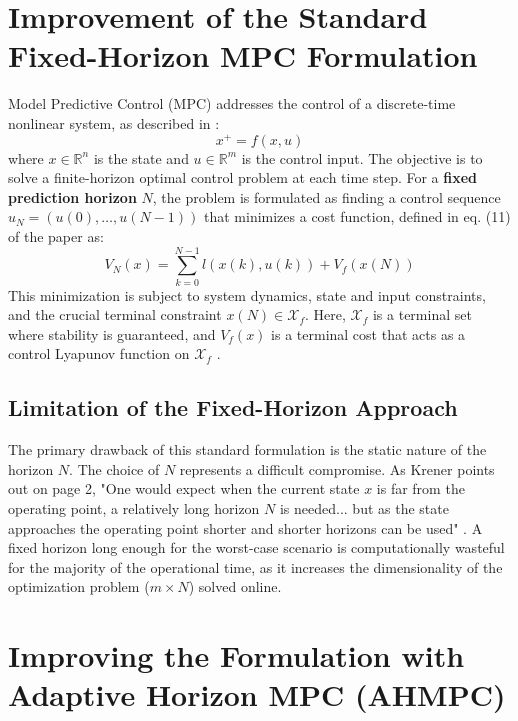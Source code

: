 \section{Improvement of the Standard Fixed-Horizon MPC Formulation}

Model Predictive Control (MPC) addresses the control of a discrete-time nonlinear system, as described in \cite{krener2016adaptive}:
\begin{equation}
    x^{+} = f(x, u)
    \label{eq:system}
\end{equation}
where $x \in \mathbb{R}^n$ is the state and $u \in \mathbb{R}^m$ is the control input. The objective is to solve a finite-horizon optimal control problem at each time step. For a \textbf{fixed prediction horizon} $N$, the problem is formulated as finding a control sequence $u_N = (u(0), \dots, u(N-1))$ that minimizes a cost function, defined in eq. (11) of the paper as:
\begin{equation}
    V_N(x) = \sum_{k=0}^{N-1} l(x(k), u(k)) + V_f(x(N))
    \label{eq:cost}
\end{equation}
This minimization is subject to system dynamics, state and input constraints, and the crucial terminal constraint $x(N) \in \mathcal{X}_f$. Here, $\mathcal{X}_f$ is a terminal set where stability is guaranteed, and $V_f(x)$ is a terminal cost that acts as a control Lyapunov function on $\mathcal{X}_f$ \cite{krener2016adaptive}.

\subsection{Limitation of the Fixed-Horizon Approach}
The primary drawback of this standard formulation is the static nature of the horizon $N$. The choice of $N$ represents a difficult compromise. As Krener points out on page 2, "One would expect when the current state $x$ is far from the operating point, a relatively long horizon $N$ is needed... but as the state approaches the operating point shorter and shorter horizons can be used" \cite{krener2016adaptive}. A fixed horizon long enough for the worst-case scenario is computationally wasteful for the majority of the operational time, as it increases the dimensionality of the optimization problem ($m \times N$) solved online.

\section{Improving the Formulation with Adaptive Horizon MPC (AHMPC)}

